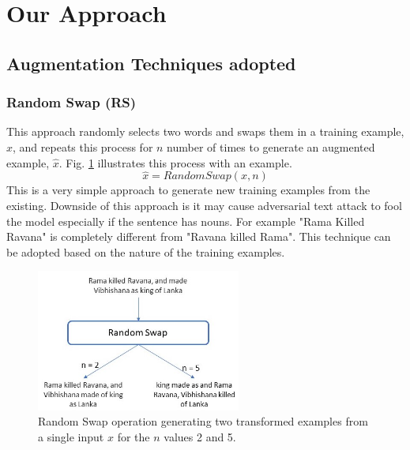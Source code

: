 \documentclass{article}
\begin{document}
\section{Our Approach}
\subsection{Augmentation Techniques adopted}

\subsubsection{Random Swap (RS)}
This approach randomly selects two words and swaps them in a training example, $x$, and repeats this process for $n$ number of times to generate an augmented example, $\hat{x}$. Fig. \ref{fig:randomswap} illustrates this process with an example. 
\begin{equation}
\hat{x} = RandomSwap(x, n)
\end{equation}
This is a very simple approach to generate new training examples from the existing. Downside of this approach is it may cause adversarial text attack to fool the model especially if the sentence has nouns. For example "Rama Killed Ravana" is completely different from "Ravana killed Rama". This technique can be adopted based on the nature of the training examples.

\begin{figure}[h!]
\centering
  \includegraphics[width=0.6\textwidth]{randomswap.jpg}
  \caption{Random Swap operation generating two transformed examples from a single input $x$ for the $n$ values 2 and 5.}
  \label{fig:randomswap}
\end{figure}
\end{document}
